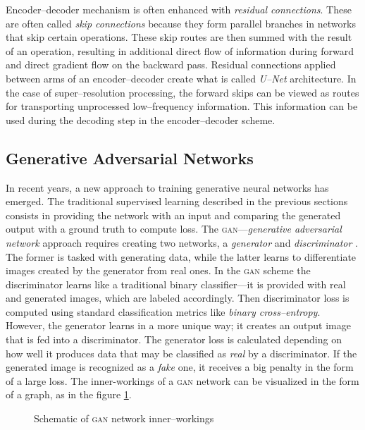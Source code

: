 Encoder--decoder mechanism is often enhanced with \textit{residual connections}.
These are often called \textit{skip connections} because they form parallel branches in networks that skip certain operations.
These skip routes are then summed with the result of an operation, resulting in additional direct flow of information during forward and direct gradient flow on the backward pass.
Residual connections applied between arms of an encoder--decoder create what is called \textit{U--Net} architecture.
In the case of super--resolution processing, the forward skips can be viewed as routes for transporting unprocessed low--frequency information.
This information can be used during the decoding step in the encoder--decoder scheme.

\subsection{Generative Adversarial Networks}
\label{sec:gans-overview}
In recent years, a new approach to training generative neural networks has emerged.
The traditional supervised learning described in the previous sections consists in providing the network with an input and comparing the generated output with a ground truth to compute loss.
The \textsc{gan}---\textit{generative adversarial network} approach requires creating two networks, a \textit{generator} and \textit{discriminator} \cite{goodfellow-2014-gans}.
The former is tasked with generating data, while the latter learns to differentiate images created by the generator from real ones.
In the \textsc{gan} scheme the discriminator learns like a traditional binary classifier---it is provided with real and generated images, which are labeled accordingly.
Then discriminator loss is computed using standard classification metrics like \textit{binary cross--entropy}.
However, the generator learns in a more unique way; it creates an output image that is fed into a discriminator.
The generator loss is calculated depending on how well it produces data that may be classified as \textit{real} by a discriminator.
If the generated image is recognized as a \textit{fake} one, it receives a big penalty in the form of a large loss.
The inner-workings of a \textsc{gan} network can be visualized in the form of a graph, as in the figure \ref{fig:gan-training}.
\begin{figure}
    \centering
    
    \caption{Schematic of \textsc{gan} network inner--workings}
    \label{fig:gan-training}
\end{figure}

